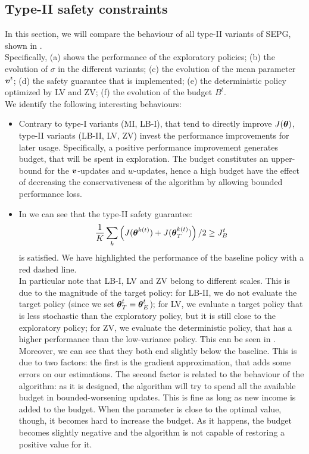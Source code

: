 \subsection{Type-II safety constraints}
In this section, we will compare the behaviour of all type-II variants of SEPG, shown in . \\
Specifically, (a) shows the performance of the exploratory policies; (b) the evolution of $\sigma$ in the different variants; (c) the evolution of the mean parameter $\vv^t$; (d) the safety guarantee that is implemented; (e) the deterministic policy optimized by LV and ZV; (f) the evolution of the budget $B^t$. \\
We identify the following interesting behaviours:
\begin{itemize}
\item Contrary to type-I variants (MI, LB-I), that  tend to directly improve $J(\vtheta)$, type-II variants (LB-II, LV, ZV) invest the  performance improvements for later usage. Specifically, a positive performance improvement generates budget, that will be spent in exploration. The budget constitutes an upper-bound for the $\vv$-updates and $w$-updates, hence a high budget have the effect of decreasing the conservativeness of the algorithm by allowing bounded performance loss.

\item In  we can see that the type-II safety guarantee:
\[
\frac{1}{K}\sum_k \left(J(\vtheta^{k(t)}) + J(\vtarget[k(t)])\right)/2 \geq \jbase
\]
is satisfied. We have highlighted the performance of the baseline policy with a red dashed line. \\
In particular note that LB-I, LV and ZV belong to different scales. This is due to the magnitude of the target policy: for LB-II, we do not evaluate the target policy (since we set $\vtheta^t_T = \vtheta^t_E$); for LV, we evaluate a target policy that is less stochastic than the exploratory policy, but it is still close to the exploratory policy; for ZV, we evaluate the deterministic policy, that has a higher performance than the low-variance policy. This can be seen in . \\
Moreover, we can see that they both end slightly below the baseline. This is due to two factors: the first is the gradient approximation, that adds some errors on our estimations. The second factor is related to the behaviour of the algorithm: as it is designed, the algorithm will try to spend all the available budget in bounded-worsening updates. This is fine as long as new income is added to the budget. When the parameter is close to the optimal value, though, it becomes hard to increase the budget. As it happens, the budget becomes slightly negative and the algorithm is not capable of restoring a positive value for it. 


\end{itemize}

